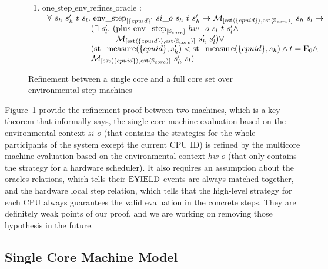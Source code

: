 \begin{figure}
\begin{enumerate}
\item one$\_$step$\_$env$\_$refines$\_$oracle : \\
$
\begin{array}{l}
\forall \ s_h \ s_h' \ t \ s_l. \ \envstep{\set{cpuid}}{si\_o}{s_h}{t}{s_h'} \rightarrow  \matchestateestate{\set{cpuid}}{s_h}{s_l} \rightarrow \\
\ \ \ \ \ \ \ \ \ \ \ \ \ \ \ \ (\exists \ s_l' .\ (\ccplusstep{\envstep{\coreset}{hw\_o}{s_l}{t}{s_l'}} \wedge\\
\ \ \ \ \ \ \ \ \ \ \ \ \ \ \ \ \ \ \ \ \ \ \ \ \  \matchestateestate{\set{cpuid}}{s_h'}{s_l'}) \vee \\ 
\ \ \ \ \ \ \ \ \ \ \ \ \ \ \ \ (\mcstatemeasurenoeq{\set{cpuid}}{s_h'} < \mcstatemeasurenoeq{\set{cpuid}}{s_h} \wedge t = \ccemptytrace \wedge \\ 
\ \ \ \ \ \ \ \ \ \ \ \ \ \ \ \ \matchestateestate{\set{cpuid}}{s_h'}{s_l})\\
\end{array}
$
\end{enumerate}
\caption{Refinement between a single core and a full core set over environmental step machines}
\label{fig:chapter:conlink:cpu-env-to-env-theorem}
\end{figure}


Figure~\ref{fig:chapter:conlink:cpu-env-to-env-theorem} provide the 
refinement proof between two machines, 
which is a key theorem that informally says, the single core machine evaluation based on the environmental context $si\_o$ (that contains 
the strategies for the whole participants of the system except the current CPU ID)
is refined
by the multicore machine evaluation based on the environmental context $hw\_o$ (that only contains the strategy for a hardware scheduler).
It also requires an assumption about the oracles relations, which tells their ${\mathrm{EYIELD}}$ events
are always matched together, 
and the hardware local step relation, which tells that the high-level strategy for each CPU always guarantees
the valid evaluation in the concrete steps. 
They are definitely weak points of our proof, and we are working on 
removing those hypothesis in the future.


\subsection{Single Core Machine Model}
\label{chapter:linking:subsec:single-core-machine-model}


